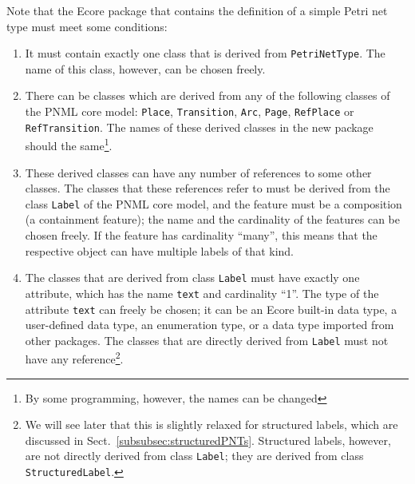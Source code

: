 Note that the Ecore package that contains the definition of a simple
Petri net type must meet some conditions:
\begin{enumerate}
  \item It must contain exactly one class that is derived from
        {\tt PetriNetType}. The name of this class, however, can be chosen
        freely.
        
  \item There can be classes which are derived from any of the
        following classes of the PNML core model: 
        {\tt Place}, {\tt Transition}, {\tt Arc}, {\tt Page}, 
        {\tt RefPlace} or {\tt RefTransition}. The names of
        these derived classes in the new package should the same\footnote
          {By some programming, however, the names can be changed}.
          
   \item These derived classes can have any number of references to some
         other classes. The classes that these references refer to
         must be derived from the class {\tt Label}%
         of the PNML core model,
         and the feature must be a composition (a containment feature); the name
         and the cardinality of the features can be chosen freely. If
         the feature has cardinality ``many'', this means that the respective
         object can have multiple labels of that kind.
         
   \item The classes that are derived from class {\tt Label}  must have
         exactly one attribute, which has the name {\tt text}%
         and cardinality ``1''.
         The type of the attribute {\tt text} can freely be chosen; it can
         be an Ecore built-in data type, a user-defined data type, an
         enumeration type, or a data type imported from other packages. The
         classes that are directly derived from {\tt Label}%
         must not have any reference\footnote
           {We will see later that this is slightly relaxed for structured
           labels, which are discussed in
           Sect.~\ref{subsubsec:structuredPNTs}. Structured labels, however, are
           not directly derived from class {\tt Label}; they are derived
           from class {\tt StructuredLabel}.}.
            

\end{enumerate}
